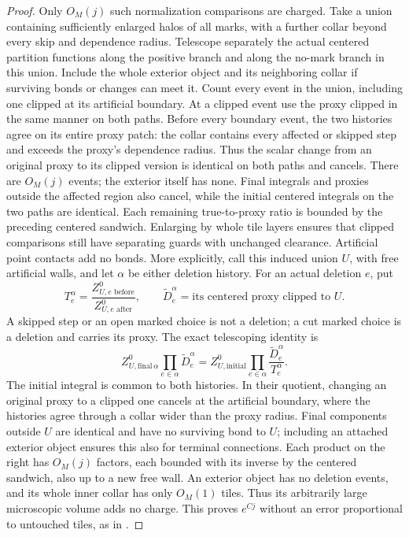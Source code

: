\begin{proof}
Only \(O_M(j)\) such normalization comparisons are charged.
Take a union containing sufficiently enlarged halos of all marks,
with a further collar beyond every skip and dependence radius.
Telescope separately the actual centered partition functions along
the positive branch and along the no-mark branch in this union.
Include the whole exterior object and its neighboring collar if
surviving bonds or changes can meet it. Count every event in the
union, including one clipped at its artificial boundary. At a
clipped event use the proxy clipped in the same manner on both
paths. Before every boundary event, the two histories agree
on its entire proxy patch: the collar contains every affected
or skipped step and exceeds the proxy's dependence radius.
Thus the scalar change from an original proxy to its clipped
version is identical on both paths and cancels. There are
\(O_M(j)\) events; the exterior itself
has none. Final integrals and proxies outside the affected region
also cancel, while the initial centered integrals on the two paths
are identical. Each remaining true-to-proxy ratio is bounded by
the preceding centered sandwich. Enlarging by whole tile layers
ensures that clipped comparisons still have separating guards
with unchanged clearance. Artificial point contacts add no bonds.
More explicitly, call this induced union \(U\), with free
artificial walls, and let \(\alpha\) be either deletion history.
For an actual deletion \(e\), put
\[
 T_e^\alpha=\frac{Z_{U,e\text{ before}}^0}
                  {Z_{U,e\text{ after}}^0},
 \qquad \widetilde D_e^\alpha
       =\text{its centered proxy clipped to }U.
\]
A skipped step or an open marked choice is not a deletion;
a cut marked choice is a deletion and carries its proxy.
The exact telescoping identity is
\begin{equation}\label{eq:magnetic-centered-telescope}
 Z_{U,\mathrm{final}\,\alpha}^0
       \prod_{e\in\alpha}\widetilde D_e^\alpha
   =Z_{U,\mathrm{initial}}^0
       \prod_{e\in\alpha}\frac{\widetilde D_e^\alpha}{T_e^\alpha}.
\end{equation}
The initial integral is common to both histories. In their
quotient, changing an original proxy to a clipped one cancels
at the artificial boundary, where the histories agree through
a collar wider than the proxy radius. Final components outside
\(U\) are identical and have no surviving bond to \(U\);
including an attached exterior object ensures this also for
terminal connections. Each product on the right has \(O_M(j)\)
factors, each bounded with its inverse by the centered
sandwich, also up to a new free wall. An exterior object has
no deletion events, and its whole inner collar has only
\(O_M(1)\) tiles. Thus its arbitrarily large microscopic
volume adds no charge. This proves \(e^{Cj}\) without an
error proportional to untouched tiles, as in
.


\end{proof}
